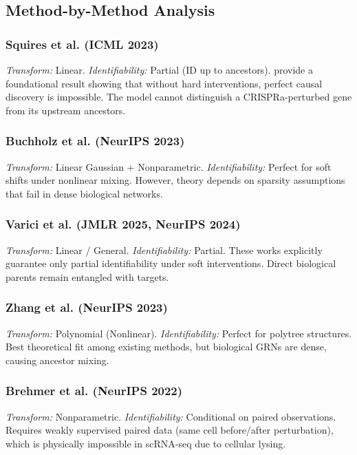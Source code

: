 
\subsection{Method-by-Method Analysis}
\label{app:crl_methods:methods}

\subsubsection{Squires et al. (ICML 2023)}
\textit{Transform:} Linear. \textit{Identifiability:} Partial (ID up to ancestors).
\citet{squires2023} provide a foundational result showing that without hard
interventions, perfect causal discovery is impossible. The model cannot
distinguish a CRISPRa-perturbed gene from its upstream ancestors.

\subsubsection{Buchholz et al. (NeurIPS 2023)}
\textit{Transform:} Linear Gaussian + Nonparametric. \textit{Identifiability:}
Perfect for soft shifts under nonlinear mixing. However, theory depends on
sparsity assumptions that fail in dense biological networks.

\subsubsection{Varici et al. (JMLR 2025, NeurIPS 2024)}
\textit{Transform:} Linear / General. \textit{Identifiability:} Partial.
These works explicitly guarantee only partial identifiability under soft
interventions. Direct biological parents remain entangled with targets.

\subsubsection{Zhang et al. (NeurIPS 2023)}
\textit{Transform:} Polynomial (Nonlinear). \textit{Identifiability:} Perfect
for polytree structures. Best theoretical fit among existing methods, but
biological GRNs are dense, causing ancestor mixing.

\subsubsection{Brehmer et al. (NeurIPS 2022)}
\textit{Transform:} Nonparametric. \textit{Identifiability:} Conditional on
paired observations. Requires weakly supervised paired data (same cell before/after
perturbation), which is physically impossible in scRNA-seq due to cellular lysing.

